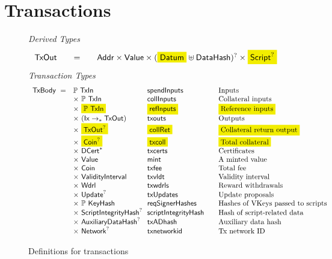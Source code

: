 \section{Transactions}
\label{sec:transactions}
\begin{figure*}[htb]
  \emph{Derived Types}
  \begin{equation*}
    \begin{array}{l@{\qquad=\qquad}lr}
      \TxOut & \Addr \times \Value \times (\hldiff{\Datum} \uniondistinct \DataHash)^? \times \hldiff{\Script^?}
    \end{array}
  \end{equation*}
  \emph{Transaction Types}
  \begin{equation*}
    \begin{array}{r@{~~}l@{~~}l@{\qquad}l}
      \TxBody ~=~
      & \powerset{\TxIn} & \fun{spendInputs}& \text{Inputs}\\
      & \times ~\powerset{\TxIn} & \fun{collInputs} & \text{Collateral inputs}\\
      & \times ~\hldiff{\powerset{\TxIn}} & \hldiff{\fun{refInputs}} & \hldiff{\text{Reference inputs}}\\
      & \times ~(\Ix \pto \TxOut) & \fun{txouts}& \text{Outputs}\\
      & \times ~\hldiff{\TxOut^?} & \hldiff{\fun{collRet}} & \hldiff{\text{Collateral return output}}\\
      & \times ~\hldiff{\Coin^?} & \hldiff{\fun{txcoll}} & \hldiff{\text{Total collateral}}\\
      & \times~ \seqof{\DCert} & \fun{txcerts}& \text{Certificates}\\
       & \times ~\Value  & \fun{mint} &\text{A minted value}\\
       & \times ~\Coin & \fun{txfee} &\text{Total fee}\\
       & \times ~\ValidityInterval & \fun{txvldt} & \text{Validity interval}\\
       & \times~ \Wdrl  & \fun{txwdrls} &\text{Reward withdrawals}\\
       & \times ~\Update^?  & \fun{txUpdates} & \text{Update proposals}\\
       & \times ~\powerset{\KeyHash} & \fun{reqSignerHashes} & \text{Hashes of VKeys passed to scripts}\\
       & \times ~\ScriptIntegrityHash^? & \fun{scriptIntegrityHash} & \text{Hash of script-related data}\\
       & \times ~\AuxiliaryDataHash^? & \fun{txADhash} & \text{Auxiliary data hash}\\
       & \times ~\Network^? & \fun{txnetworkid} & \text{Tx network ID}\\
    \end{array}
  \end{equation*}
  \caption{Definitions for transactions}
  \label{fig:defs:utxo-shelley-2}
\end{figure*}

